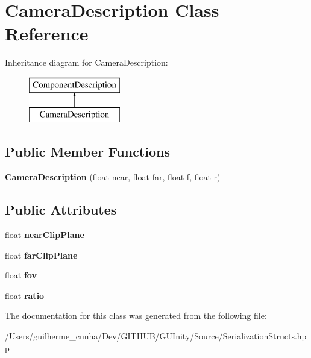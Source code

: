 \hypertarget{class_camera_description}{}\section{Camera\+Description Class Reference}
\label{class_camera_description}
Inheritance diagram for Camera\+Description\+:\begin{figure}[H]
\begin{center}
\leavevmode
\includegraphics[height=2.000000cm]{class_camera_description}
\end{center}
\end{figure}
\subsection*{Public Member Functions}
\begin{DoxyCompactItemize}
\item 
\hypertarget{class_camera_description_a01634958c1db404fada946b45c96a71a}{}{\bfseries Camera\+Description} (float near, float far, float f, float r)\label{class_camera_description_a01634958c1db404fada946b45c96a71a}

\end{DoxyCompactItemize}
\subsection*{Public Attributes}
\begin{DoxyCompactItemize}
\item 
\hypertarget{class_camera_description_a3ac937ab778dd2826ee7321f14609070}{}float {\bfseries near\+Clip\+Plane}\label{class_camera_description_a3ac937ab778dd2826ee7321f14609070}

\item 
\hypertarget{class_camera_description_a8bc1d4022d6e3e5bbb8aa1f0081683b3}{}float {\bfseries far\+Clip\+Plane}\label{class_camera_description_a8bc1d4022d6e3e5bbb8aa1f0081683b3}

\item 
\hypertarget{class_camera_description_aed2916c3a9162b8727adb21633cdbe9b}{}float {\bfseries fov}\label{class_camera_description_aed2916c3a9162b8727adb21633cdbe9b}

\item 
\hypertarget{class_camera_description_a6e3da4e7ae4c3aa74ad6140061ea52e8}{}float {\bfseries ratio}\label{class_camera_description_a6e3da4e7ae4c3aa74ad6140061ea52e8}

\end{DoxyCompactItemize}


The documentation for this class was generated from the following file\+:\begin{DoxyCompactItemize}
\item 
/\+Users/guilherme\+\_\+cunha/\+Dev/\+G\+I\+T\+H\+U\+B/\+G\+U\+Inity/\+Source/Serialization\+Structs.\+hpp\end{DoxyCompactItemize}
